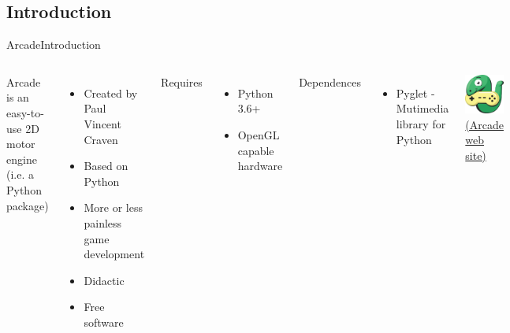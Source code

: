 \documentclass[10pt,compress]{beamer} %
\begin{document}
\subsection{Introduction}

\begin{frame}{Arcade}{Introduction}
	\begin{columns}
		Arcade is an easy-to-use 2D motor engine (i.e. a Python package)
            \begin{itemize}
		\item Created by Paul Vincent Craven
                \item Based on Python
                \item More or less painless game development
                \item Didactic
                \item Free software
            \end{itemize}

        	Requires
            \begin{itemize}
                \item Python 3.6+
                \item OpenGL capable hardware
            \end{itemize}

            Dependences
            \begin{itemize}
                \item Pyglet - Mutimedia library for Python
            \end{itemize}

            \includegraphics[width=\linewidth]{figs/arcade-logo}\\
    		\href{http://arcade.academy}{(Arcade web site)}
	\end{columns}
\end{frame}
\end{document}
